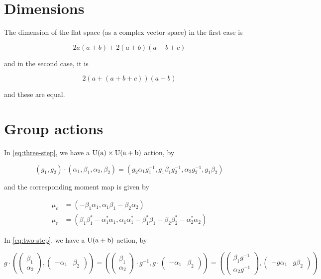 \documentclass{article}
\begin{document}
\section*{Dimensions}

The dimension of the flat space (as a complex vector space) in the first case is

\[2a(a+b) + 2(a+b)(a+b+c)\]

and in the second case, it is

\[2(a + (a + b + c))(a + b)\]

and these are equal.

\section*{Group actions}

In \cref{eq:three-step}, we have a \(\rm U(a) \times \rm U(a + b)\) action, by

\begin{equation}
    \label{eq:three-step-action}
    (g_1, g_2) \cdot (\alpha_1, \beta_1, \alpha_2, \beta_2) = (g_2\alpha_1g_1^{-1}, g_1\beta_1g_2^{-1}, \alpha_2g_2^{-1}, g_1\beta_2)
\end{equation}

and the corresponding moment map is given by

\begin{align*}
    \mu_c &= (-\beta_1\alpha_1, \alpha_1 \beta_1 - \beta_2\alpha_2) \\
    \mu_r &= (\beta_1\beta_1^* - \alpha_1^*\alpha_1, \alpha_1\alpha_1^* - \beta_1^*\beta_1 + \beta_2\beta_2^* - \alpha_2^*\alpha_2)
\end{align*}

In \cref{eq:two-step}, we have a \(\rm U(a + b)\) action, by

\begin{equation}
    \label{eq:two-step-action}
    g \cdot \left(\begin{pmatrix}
        \beta_1 \\ \alpha_2
    \end{pmatrix}, \begin{pmatrix}
        -\alpha_1 & \beta_2
    \end{pmatrix}\right) = \left(\begin{pmatrix}
        \beta_1 \\ \alpha_2
    \end{pmatrix} \cdot g^{-1}, g \cdot \begin{pmatrix}
        -\alpha_1 & \beta_2
    \end{pmatrix}\right) = \left(\begin{pmatrix}
        \beta_1g^{-1} \\ \alpha_2g^{-1}
    \end{pmatrix}, \begin{pmatrix}
        -g\alpha_1 & g\beta_2
    \end{pmatrix}\right)
\end{equation}
\end{document}
